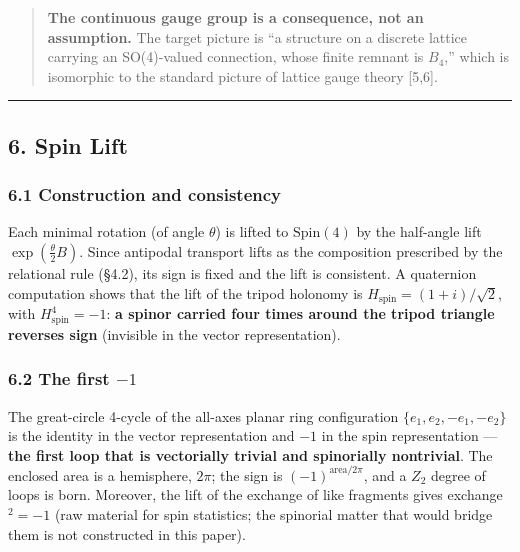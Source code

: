 \documentclass[
]{article}
\begin{document}
\begin{quote}
\textbf{The continuous gauge group is a consequence, not an assumption.}
The target picture is ``a structure on a discrete lattice carrying an
SO(4)-valued connection, whose finite remnant is \(B_4\),'' which is
isomorphic to the standard picture of lattice gauge theory {[}5,6{]}.
\end{quote}

\begin{center}\rule{0.5\linewidth}{0.5pt}\end{center}

\subsection{6. Spin Lift}\label{spin-lift}

\subsubsection{6.1 Construction and
consistency}\label{construction-and-consistency}

Each minimal rotation (of angle \(\theta\)) is lifted to
\(\mathrm{Spin}(4)\) by the half-angle lift \(\exp(\tfrac\theta2 B)\).
Since antipodal transport lifts as the composition prescribed by the
relational rule (§4.2), its sign is fixed and the lift is consistent. A
quaternion computation shows that the lift of the tripod holonomy is
\(H_{\mathrm{spin}}=(1+i)/\sqrt2\), with \(H_{\mathrm{spin}}^4=-1\):
\textbf{a spinor carried four times around the tripod triangle reverses
sign} (invisible in the vector representation).

\subsubsection{\texorpdfstring{6.2 The first
\(-1\)}{6.2 The first -1}}\label{the-first--1}

The great-circle 4-cycle of the all-axes planar ring configuration
\(\{e_1,e_2,-e_1,-e_2\}\) is the identity in the vector representation
and \(-1\) in the spin representation --- \textbf{the first loop that is
vectorially trivial and spinorially nontrivial}. The enclosed area is a
hemisphere, \(2\pi\); the sign is \((-1)^{\text{area}/2\pi}\), and a
\(Z_2\) degree of loops is born. Moreover, the lift of the exchange of
like fragments gives exchange\(^2=-1\) (raw material for spin
statistics; the spinorial matter that would bridge them is not
constructed in this paper).
\end{document}
